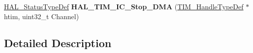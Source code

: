\begin{DoxyCompactItemize}
\item 
\hyperlink{stm32f4xx__hal__def_8h_a63c0679d1cb8b8c684fbb0632743478f}{H\+A\+L\+\_\+\+Status\+Type\+Def} {\bfseries H\+A\+L\+\_\+\+T\+I\+M\+\_\+\+I\+C\+\_\+\+Stop\+\_\+\+D\+MA} (\hyperlink{struct_t_i_m___handle_type_def}{T\+I\+M\+\_\+\+Handle\+Type\+Def} $\ast$htim, uint32\+\_\+t Channel)\hypertarget{group___t_i_m___exported___functions___group4_ga8e7dc17f058ef9c826774436d68f80b5}{}\label{group___t_i_m___exported___functions___group4_ga8e7dc17f058ef9c826774436d68f80b5}

\end{DoxyCompactItemize}


\subsection{Detailed Description}
